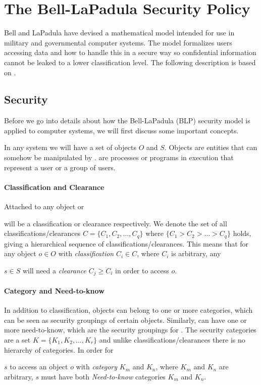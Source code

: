 \section{The Bell-LaPadula Security Policy}

Bell and LaPadula have devised a mathematical model intended for use in  military and governmental computer systems.
The model formalizes users accessing data and how to handle this in a secure way so confidential information cannot be leaked to a lower classification level.
The following description is based on \citet{lapadula1996secure}.

\subsection{Security}
Before we go into details about how the Bell-LaPadula (BLP) security model is applied to computer systems, we will first discuss some important concepts.

In any system we will have a set of objects $O$ and \subjects{} $S$.
Objects are entities that can somehow be manipulated by \subjects{}.
\Subjects{} are processes or programs in execution that represent a user or a group of users.

\paragraph{Classification and Clearance}
Attached to any object or \subject{} will be a classification or clearance respectively.
We denote the set of all classifications/clearances $C = \{C_1, C_2,\dots,C_q\}$ where $\{C_1 > C_2 > \dots > C_q\}$ holds, giving a hierarchical sequence of classifications/clearances.
This means that for any object $o \in O$ with \textit{classification} $C_i \in C$, where $C_i$ is arbitrary, any \subject{} $s \in S$ will need a \textit{clearance} $C_j \geq C_i$ in order to access $o$.

\paragraph{Category and Need-to-know}
In addition to classification, objects can belong to one or more categories, which can be seen as security groupings of certain objects.
Similarly, \subjects{} can have one or more need-to-know, which are the security groupings for \subjects{}.
The security categories are a set $K = \{K_1, K_2, \dots, K_r\}$ and unlike classifications/clearances there is no hierarchy of categories.
In order for \subject{} $s$ to access an object $o$ with \textit{category} $K_m$ and $K_n$, where $K_m$ and $K_n$ are arbitrary, $s$ must have both \textit{Need-to-know} categories $K_m$ and $K_n$.

